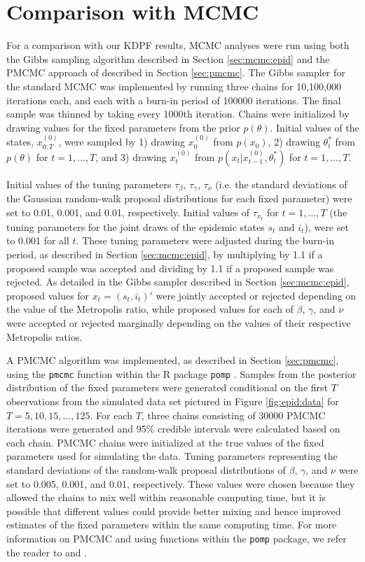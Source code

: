 \section{Comparison with MCMC} \label{sec:epid:pmcmc}

For a comparison with our KDPF results, MCMC analyses were run using both the Gibbs sampling algorithm described in Section \ref{sec:mcmc:epid} and the PMCMC approach of \citet{Andr:Douc:Hol:pmcmc:2010} described in Section \ref{sec:pmcmc}. The Gibbs sampler for the standard MCMC was implemented by running three chains for 10,100,000 iterations each, and each with a burn-in period of 100000 iterations. The final sample was thinned by taking every 1000th iteration. Chains were initialized by drawing values for the fixed parameters from the prior $p(\theta)$. Initial values of the states, $x_{0:T}^{(0)}$, were sampled by 1) drawing $x_0^{(0)}$ from $p(x_0)$, 2) drawing $\theta^*_t$ from $p(\theta)$ for $t =1,\ldots,T$, and 3) drawing $x_t^{(0)}$ from $p(x_t|x_{t-1}^{(0)},\theta^*_t)$ for $t =1,\ldots,T$.

Initial values of the tuning parameters $\tau_{\beta}$, $\tau_{\gamma}$, $\tau_{\nu}$ (i.e. the standard deviations of the Gaussian random-walk proposal distributions for each fixed parameter) were set to 0.01, 0.001, and 0.01, respectively. Initial values of $\tau_{x_t}$ for $t = 1,\ldots,T$ (the tuning parameters for the joint draws of the epidemic states $s_t$ and $i_t$), were set to 0.001 for all $t$. These tuning parameters were adjusted during the burn-in period, as described in Section \ref{sec:mcmc:epid}, by multiplying by 1.1 if a proposed sample was accepted and dividing by 1.1 if a proposed sample was rejected. As detailed in the Gibbs sampler described in Section \ref{sec:mcmc:epid}, proposed values for $x_t = (s_t,i_t)'$ were jointly accepted or rejected depending on the value of the Metropolis ratio, while proposed values for each of $\beta$, $\gamma$, and $\nu$ were accepted or rejected marginally depending on the values of their respective Metropolis ratios.

A PMCMC algorithm was implemented, as described in Section \ref{sec:pmcmc}, using the {\tt pmcmc} function within the R package {\tt pomp} \citep{pomp}. Samples from the posterior distribution of the fixed parameters were generated conditional on the first $T$ observations from the simulated data set pictured in Figure \ref{fig:epid:data} for $T = 5, 10, 15, \ldots, 125$. For each $T$, three chains consisting of 30000 PMCMC iterations were generated and 95\% credible intervals were calculated based on each chain. PMCMC chains were initialized at the true values of the fixed parameters used for simulating the data. Tuning parameters representing the standard deviations of the random-walk proposal distributions of $\beta$, $\gamma$, and $\nu$ were set to 0.005, 0.001, and 0.01, respectively. These values were chosen because they allowed the chains to mix well within reasonable computing time, but it is possible that different values could provide better mixing and hence improved estimates of the fixed parameters within the same computing time. For more information on PMCMC and using functions within the {\tt pomp} package, we refer the reader to \citet{Andr:Douc:Hol:pmcmc:2010} and \citet{pomp}.

